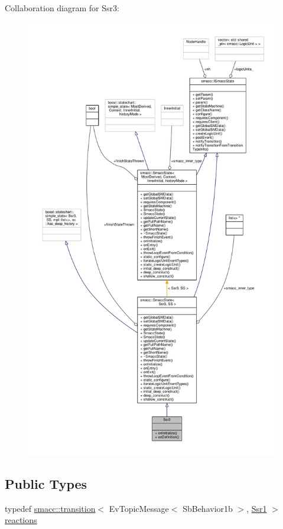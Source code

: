 Collaboration diagram for Ssr3\+:
\nopagebreak
\begin{figure}[H]
\begin{center}
\leavevmode
\includegraphics[height=550pt]{structSsr3__coll__graph}
\end{center}
\end{figure}
\subsection*{Public Types}
\begin{DoxyCompactItemize}
\item 
typedef \hyperlink{classsmacc_1_1transition}{smacc\+::transition}$<$ Ev\+Topic\+Message$<$ Sb\+Behavior1b $>$, \hyperlink{structSsr1}{Ssr1} $>$ \hyperlink{structSsr3_abadc028b9814c44114b1eda6520c6874}{reactions}
\end{DoxyCompactItemize}

